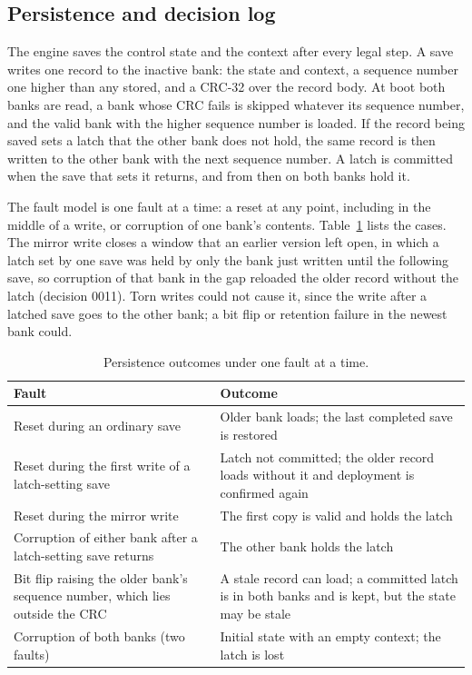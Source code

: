 \documentclass[preprint,12pt]{elsarticle}
\begin{document}
\subsection{Persistence and decision log}\label{sec:persistence}

The engine saves the control state and the context after every legal step. A save writes one record to the inactive bank: the state and context, a sequence number one higher than any stored, and a CRC-32 over the record body. At boot both banks are read, a bank whose CRC fails is skipped whatever its sequence number, and the valid bank with the higher sequence number is loaded. If the record being saved sets a latch that the other bank does not hold, the same record is then written to the other bank with the next sequence number. A latch is committed when the save that sets it returns, and from then on both banks hold it.

The fault model is one fault at a time: a reset at any point, including in the middle of a write, or corruption of one bank's contents. Table~\ref{tab:persist} lists the cases. The mirror write closes a window that an earlier version left open, in which a latch set by one save was held by only the bank just written until the following save, so corruption of that bank in the gap reloaded the older record without the latch (decision 0011). Torn writes could not cause it, since the write after a latched save goes to the other bank; a bit flip or retention failure in the newest bank could.

\begin{table}[t]
\centering
\footnotesize
\caption{Persistence outcomes under one fault at a time.}
\label{tab:persist}
\begin{tabular}{@{}p{}p{}@{}}
\toprule
Fault & Outcome \\
\midrule
Reset during an ordinary save & Older bank loads; the last completed save is restored \\
Reset during the first write of a latch-setting save & Latch not committed; the older record loads without it and deployment is confirmed again \\
Reset during the mirror write & The first copy is valid and holds the latch \\
Corruption of either bank after a latch-setting save returns & The other bank holds the latch \\
Bit flip raising the older bank's sequence number, which lies outside the CRC & A stale record can load; a committed latch is in both banks and is kept, but the state may be stale \\
Corruption of both banks (two faults) & Initial state with an empty context; the latch is lost \\
\bottomrule
\end{tabular}
\end{table}
\end{document}
